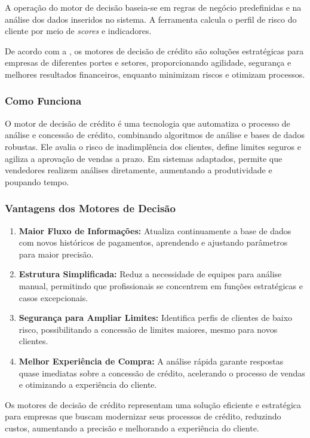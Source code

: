 \documentclass[12pt,a4paper]{article}
\begin{document}
A operação do motor de decisão baseia-se em regras de negócio predefinidas e na análise dos dados inseridos no sistema. A ferramenta calcula o perfil de risco do cliente por meio de \textit{scores} e indicadores. 

De acordo com a \cite{deps_sd}, os motores de decisão de crédito são soluções estratégicas para empresas de diferentes portes e setores, proporcionando agilidade, segurança e melhores resultados financeiros, enquanto minimizam riscos e otimizam processos.

\subsubsection{Como Funciona}

O motor de decisão de crédito é uma tecnologia que automatiza o processo de análise e concessão de crédito, combinando algoritmos de análise e bases de dados robustas. Ele avalia o risco de inadimplência dos clientes, define limites seguros e agiliza a aprovação de vendas a prazo. Em sistemas adaptados, permite que vendedores realizem análises diretamente, aumentando a produtividade e poupando tempo.

\subsubsection{Vantagens dos Motores de Decisão}

\begin{enumerate}
    \item \textbf{Maior Fluxo de Informações:} Atualiza continuamente a base de dados com novos históricos de pagamentos, aprendendo e ajustando parâmetros para maior precisão.
    \item \textbf{Estrutura Simplificada:} Reduz a necessidade de equipes para análise manual, permitindo que profissionais se concentrem em funções estratégicas e casos excepcionais.
    \item \textbf{Segurança para Ampliar Limites:} Identifica perfis de clientes de baixo risco, possibilitando a concessão de limites maiores, mesmo para novos clientes.
    \item \textbf{Melhor Experiência de Compra:} A análise rápida garante respostas quase imediatas sobre a concessão de crédito, acelerando o processo de vendas e otimizando a experiência do cliente.
\end{enumerate}

Os motores de decisão de crédito representam uma solução eficiente e estratégica para empresas que buscam modernizar seus processos de crédito, reduzindo custos, aumentando a precisão e melhorando a experiência do cliente.
\end{document}
